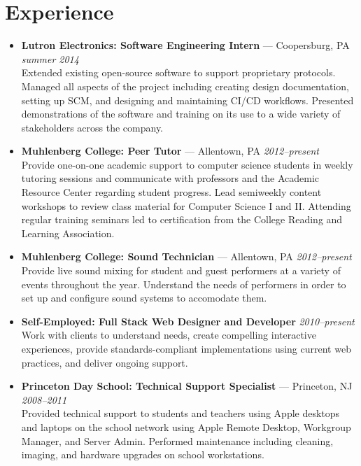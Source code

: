 \documentclass[11pt]{article}
\begin{document}
\section*{Experience}
\begin{itemize}
  \item \textbf{Lutron Electronics: Software Engineering Intern} --- Coopersburg, PA \hfill {\em summer 2014} \\
    Extended existing open-source software to support proprietary protocols. Managed all aspects of the project including creating design documentation, setting up SCM, and designing and maintaining CI/CD workflows. Presented demonstrations of the software and training on its use to a wide variety of stakeholders across the company.

  \item \textbf{Muhlenberg College: Peer Tutor} --- Allentown, PA \hfill {\em 2012--present} \\
    Provide one-on-one academic support to computer science students in weekly tutoring sessions and communicate with professors and the Academic Resource Center regarding student progress. Lead semiweekly content workshops to review class material for Computer Science I and II. Attending regular training seminars led to certification from the College Reading and Learning Association.

  \item \textbf{Muhlenberg College: Sound Technician} --- Allentown, PA \hfill {\em 2012--present} \\
    Provide live sound mixing for student and guest performers at a variety of events throughout the year. Understand the needs of performers in order to set up and configure sound systems to accomodate them.

  \item \textbf{Self-Employed: Full Stack Web Designer and Developer} \hfill {\em 2010--present} \\
    Work with clients to understand needs, create compelling interactive experiences, provide standards-compliant implementations using current web practices, and deliver ongoing support.

  \item \textbf{Princeton Day School: Technical Support Specialist} --- Princeton, NJ \hfill {\em 2008--2011} \\
    Provided technical support to students and teachers using Apple desktops and laptops on the school network using Apple Remote Desktop, Workgroup Manager, and Server Admin. Performed maintenance including cleaning, imaging, and hardware upgrades on school workstations.
\end{itemize}
\end{document}
